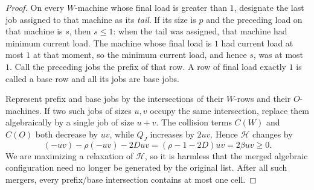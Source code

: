 \documentclass[11pt]{article}
\theoremstyle{remark}
\begin{document}
\begin{proof}
On every $W$-machine whose final load is greater than $1$, designate
the last job assigned to that machine as its \emph{tail}.  If its size is
$p$ and the preceding load on that machine is $s$, then $s\leq1$:
when the tail was assigned, that machine had minimum current load.  The
machine whose final load is $1$ had current load at most $1$ at that
moment, so the minimum current load, and hence $s$, was at most $1$.
Call the preceding jobs the prefix of that row.  A row of final load
exactly $1$ is called a base row and all its jobs are base jobs.

Represent prefix and base jobs by the intersections of their $W$-rows
and their $O$-machines.  If two such jobs of sizes $u,v$ occupy the
same intersection, replace them algebraically by a single job of size
$u+v$.  The collision terms $C(W)$ and $C(O)$ both decrease by
$uv$, while $Q_J$ increases by $2uv$.  Hence $\mathcal H$ changes by
\begin{equation}\label{eq:cell-merge-change}
 (-uv)-\rho(-uv)-2Duv
 = (\rho-1-2D)uv=2\beta uv\geq0.
\end{equation}
We are maximizing a relaxation of $\mathcal H$, so it is harmless that the
merged algebraic configuration need no longer be generated by the
original list.  After all such mergers, every prefix/base intersection
contains at most one cell.


\end{proof}
\end{document}
